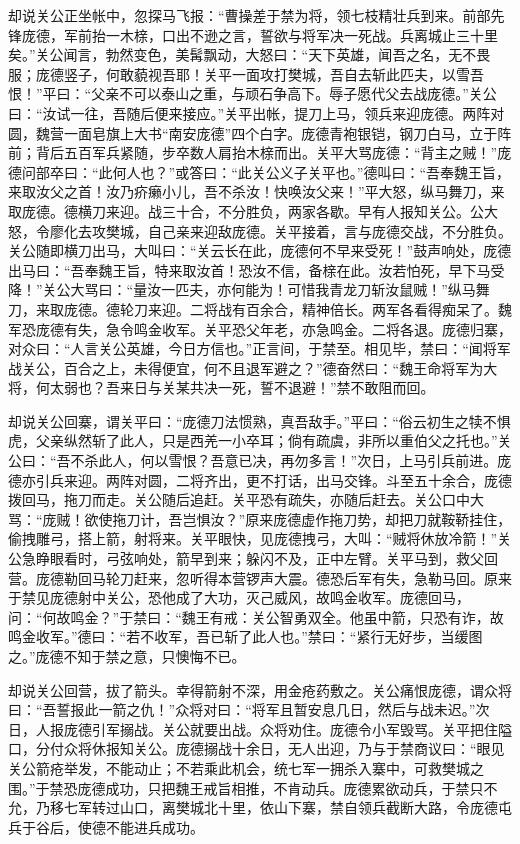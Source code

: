 却说关公正坐帐中，忽探马飞报：“曹操差于禁为将，领七枝精壮兵到来。前部先锋庞德，军前抬一木榇，口出不逊之言，誓欲与将军决一死战。兵离城止三十里矣。”关公闻言，勃然变色，美髯飘动，大怒曰：“天下英雄，闻吾之名，无不畏服；庞德竖子，何敢藐视吾耶！关平一面攻打樊城，吾自去斩此匹夫，以雪吾恨！”平曰：“父亲不可以泰山之重，与顽石争高下。辱子愿代父去战庞德。”关公曰：“汝试一往，吾随后便来接应。”关平出帐，提刀上马，领兵来迎庞德。两阵对圆，魏营一面皂旗上大书“南安庞德”四个白字。庞德青袍银铠，钢刀白马，立于阵前；背后五百军兵紧随，步卒数人肩抬木榇而出。关平大骂庞德：“背主之贼！”庞德问部卒曰：“此何人也？”或答曰：“此关公义子关平也。”德叫曰：“吾奉魏王旨，来取汝父之首！汝乃疥癞小儿，吾不杀汝！快唤汝父来！”平大怒，纵马舞刀，来取庞德。德横刀来迎。战三十合，不分胜负，两家各歇。早有人报知关公。公大怒，令廖化去攻樊城，自己亲来迎敌庞德。关平接着，言与庞德交战，不分胜负。关公随即横刀出马，大叫曰：“关云长在此，庞德何不早来受死！”鼓声响处，庞德出马曰：“吾奉魏王旨，特来取汝首！恐汝不信，备榇在此。汝若怕死，早下马受降！”关公大骂曰：“量汝一匹夫，亦何能为！可惜我青龙刀斩汝鼠贼！”纵马舞刀，来取庞德。德轮刀来迎。二将战有百余合，精神倍长。两军各看得痴呆了。魏军恐庞德有失，急令鸣金收军。关平恐父年老，亦急鸣金。二将各退。庞德归寨，对众曰：“人言关公英雄，今日方信也。”正言间，于禁至。相见毕，禁曰：“闻将军战关公，百合之上，未得便宜，何不且退军避之？”德奋然曰：“魏王命将军为大将，何太弱也？吾来日与关某共决一死，誓不退避！”禁不敢阻而回。

却说关公回寨，谓关平曰：“庞德刀法惯熟，真吾敌手。”平曰：“俗云初生之犊不惧虎，父亲纵然斩了此人，只是西羌一小卒耳；倘有疏虞，非所以重伯父之托也。”关公曰：“吾不杀此人，何以雪恨？吾意已决，再勿多言！”次日，上马引兵前进。庞德亦引兵来迎。两阵对圆，二将齐出，更不打话，出马交锋。斗至五十余合，庞德拨回马，拖刀而走。关公随后追赶。关平恐有疏失，亦随后赶去。关公口中大骂：“庞贼！欲使拖刀计，吾岂惧汝？”原来庞德虚作拖刀势，却把刀就鞍鞒挂住，偷拽雕弓，搭上箭，射将来。关平眼快，见庞德拽弓，大叫：“贼将休放冷箭！”关公急睁眼看时，弓弦响处，箭早到来；躲闪不及，正中左臂。关平马到，救父回营。庞德勒回马轮刀赶来，忽听得本营锣声大震。德恐后军有失，急勒马回。原来于禁见庞德射中关公，恐他成了大功，灭己威风，故鸣金收军。庞德回马，问：“何故鸣金？”于禁曰：“魏王有戒：关公智勇双全。他虽中箭，只恐有诈，故鸣金收军。”德曰：“若不收军，吾已斩了此人也。”禁曰：“紧行无好步，当缓图之。”庞德不知于禁之意，只懊悔不已。

却说关公回营，拔了箭头。幸得箭射不深，用金疮药敷之。关公痛恨庞德，谓众将曰：“吾誓报此一箭之仇！”众将对曰：“将军且暂安息几日，然后与战未迟。”次日，人报庞德引军搦战。关公就要出战。众将劝住。庞德令小军毁骂。关平把住隘口，分付众将休报知关公。庞德搦战十余日，无人出迎，乃与于禁商议曰：“眼见关公箭疮举发，不能动止；不若乘此机会，统七军一拥杀入寨中，可救樊城之围。”于禁恐庞德成功，只把魏王戒旨相推，不肯动兵。庞德累欲动兵，于禁只不允，乃移七军转过山口，离樊城北十里，依山下寨，禁自领兵截断大路，令庞德屯兵于谷后，使德不能进兵成功。

